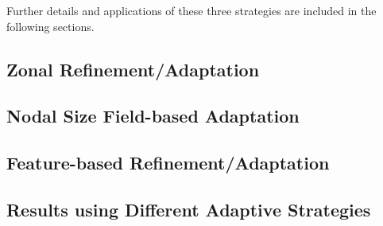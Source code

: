 Further details and applications of these three strategies are included in the following sections.

\subsection{Zonal Refinement/Adaptation}


\subsection{Nodal Size Field-based Adaptation}


\subsection{Feature-based Refinement/Adaptation}

\label{sec:feature_based_strat}


\subsection{Results using Different Adaptive Strategies}

\label{sec:results_adapt}
